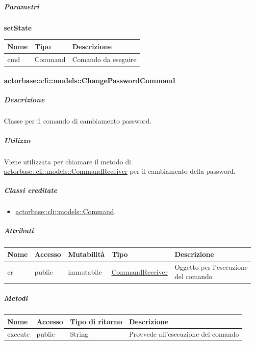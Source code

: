 \documentclass{scalatekids-article}
\begin{document}
\subparagraph{Parametri}

\begin{center}
  \textbf{setState}
\end{center}
\begin{tabular}{| p{3cm} | p{3.5cm} | p{8.5cm} |}
  \hline
  Nome & Tipo & Descrizione\\
  \hline
  cmd & Command & Comando da eseguire\\
  \hline
\end{tabular}

\paragraph{actorbase::cli::models::ChangePasswordCommand}
\label{sec:actorbase::cli::models::ChangePasswordCommand}

\subparagraph{Descrizione}

Classe per il comando di cambiamento password.

\subparagraph{Utilizzo}

Viene utilizzata per chiamare il metodo di
\hyperref[sec:actorbase::cli::models::CommandReceiver]{actorbase::cli::models::CommandReceiver} per il cambiamento della password.

\subparagraph{Classi ereditate}

\begin{itemize}
\item \hyperref[sec:actorbase::cli::models::Command]{actorbase::cli::models::Command}.
\end{itemize}

\subparagraph{Attributi}

\begin{tabular}{| p{1cm} | p{1.5cm} | p{2cm} | p{4cm} | p{8.5cm} |}
  \hline
  Nome & Accesso & Mutabilità & Tipo & Descrizione\\
  \hline
  cr & public & immutabile & \hyperref[sec:actorbase::cli::models::CommandReceiver]{CommandReceiver} & Oggetto per l'esecuzione del comando\\
  \hline
\end{tabular}

\subparagraph{Metodi}

\begin{tabular}{| l | l | l | l |}
  \hline
  Nome & Accesso & Tipo di ritorno & Descrizione\\
  \hline
  execute & public & String & Provvede all'esecuzione del comando\\
  \hline
\end{tabular}
\end{document}
